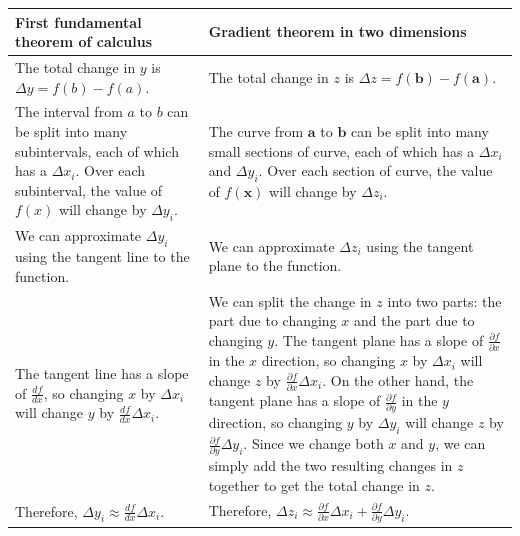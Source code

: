 \documentclass{myarticle}
\renewcommand{\vec}[1]{\mathbf{#1}}
\theoremstyle{nospace}
\newtheorem{old series theorem}{Theorem}
\newenvironment{series theorem}
{\begin{mdframed}\begin{old series theorem}}
    {\end{old series theorem}\end{mdframed}}
\begin{document}
\renewcommand{\arraystretch}{2}
\begin{longtable}{|p{}|p{}|}

  \hline

  First fundamental theorem of calculus &
  Gradient theorem in two dimensions \\

  \hline

  The total change in $y$ is $\Delta y = f(b) - f(a)$. &
  The total change in $z$ is $\Delta z = f(\vec{b}) - f(\vec{a})$. \\

  The interval from $a$ to $b$ can be split into many subintervals,
  each of which has a $\Delta x_i$. Over each subinterval, the value
  of $f(x)$ will change by $\Delta y_i$. &

  The curve from $\vec{a}$ to $\vec{b}$ can be split into many small
  sections of curve, each of which has a $\Delta x_i$ and $\Delta
  y_i$. Over each section of curve, the value of $f(\vec{x})$ will
  change by $\Delta z_i$. \\

  We can approximate $\Delta y_i$ using the tangent line to the
  function. &

  We can approximate $\Delta z_i$ using the tangent plane to the
  function. \\

  The tangent line has a slope of $\frac{df}{dx}$, so changing $x$ by
  $\Delta x_i$ will change $y$ by $\frac{df}{dx} \Delta x_i$. &

  We can split the change in $z$ into two parts: the part due to
  changing $x$ and the part due to changing $y$. The tangent plane has
  a slope of $\frac{\partial f}{\partial x}$ in the $x$ direction, so
  changing $x$ by $\Delta x_i$ will change $z$ by $\frac{\partial
    f}{\partial x} \Delta x_i$. On the other hand, the tangent plane
  has a slope of $\frac{\partial f}{\partial y}$ in the $y$ direction,
  so changing $y$ by $\Delta y_i$ will change $z$ by $\frac{\partial
    f}{\partial y} \Delta y_i$. Since we change both $x$ and $y$, we
  can simply add the two resulting changes in $z$ together to get the
  total change in $z$. \\

  Therefore, $\Delta y_i \approx \frac{df}{dx} \Delta x_i$. &

  Therefore, $\Delta z_i \approx \frac{\partial f}{\partial x} \Delta
  x_i + \frac{\partial f}{\partial y} \Delta y_i$. \\


\end{longtable}
\end{document}
